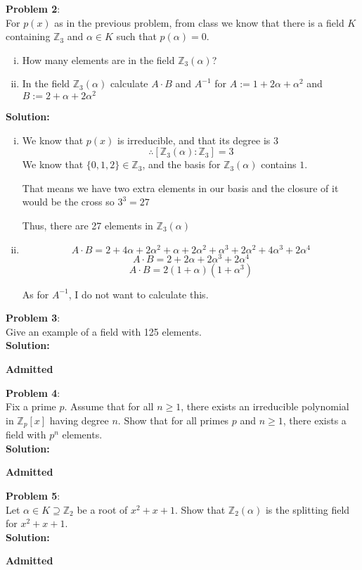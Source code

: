 \documentclass[11pt]{article}
\newcommand{\prob}[3]{\begin{flushleft}
        \textbf{Problem #1}: \\
        #2 
		\textbf{Solution:} 
		#3

\end{flushleft}}
\newcommand{\admit}{
  \begin{flushright}
    \textbf{Admitted}
  \end{flushright}
}
\begin{document}
\prob{2}{
  For $p(x)$ as in the previous problem, from class we know that there is a field $K$ containing $\mathbb{Z}_3$ and $\alpha \in K$ such that $p(\alpha) = 0$.
  \begin{enumerate}[(i)]
    \item How many elements are in the field $\mathbb{Z}_3(\alpha)$?
    \item In the field $\mathbb{Z}_3(\alpha)$ calculate $A \cdot B$ and $A^{-1}$ for
          $A := 1 + 2 \alpha + \alpha^2$ and $B := 2 + \alpha + 2 \alpha^2$
  \end{enumerate}
}{
  \begin{enumerate}[(i)]
    \item We know that $p(x)$ is irreducible, and that its degree is $3$
          $$\therefore [\mathbb{Z}_3(\alpha) : \mathbb{Z}_3] = 3$$
          We know that $\{ 0,1,2 \} \in \mathbb{Z}_3$, and the basis for
          $\mathbb{Z}_3(\alpha)$ contains $1$.

          That means we have two extra elements in our basis and the closure of it would be the cross so $3^3 = 27$

          Thus, there are 27 elements in $\mathbb{Z}_3(\alpha)$

    \item $$A \cdot B = 2 + 4\alpha + 2\alpha^2 + \alpha + 2\alpha^2 + \alpha^3 + 2 \alpha^2 + 4\alpha^3 + 2 \alpha^4$$
          $$A \cdot B = 2 + 2\alpha + 2\alpha^3 + 2\alpha^4$$
          $$A \cdot B = 2(1 + \alpha)(1 + \alpha^3)$$

          As for $A^{-1}$, I do not want to calculate this.
  \end{enumerate}
}

\prob{3}{
  Give an example of a field with 125 elements. \\
}{ \\
  \admit
}

\prob{4}{
Fix a prime $p$. Assume that for all $n \geq 1$, there exists an irreducible polynomial in $\mathbb{Z}_p[x]$ having degree $n$. Show that for all primes $p$ and $n \geq 1$, there exists a field with $p^n$ elements. \\
}{ \\
\admit
}

\prob{5}{
  Let $\alpha \in K \supseteq \mathbb{Z}_2$ be a root of $x^2 + x + 1$.
  Show that $\mathbb{Z}_2(\alpha)$ is the splitting field for $x^2 + x + 1$. \\
}{\\
  \admit
}
\end{document}

